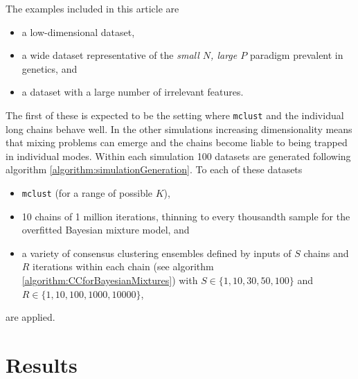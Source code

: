 \documentclass{bioinfo}
\begin{document}
The examples included in this article are
\begin{itemize}
	\item a low-dimensional dataset,
	\item a wide dataset representative of the \emph{small $N$, large $P$} paradigm prevalent in genetics, and
	\item a dataset with a large number of irrelevant features.
\end{itemize}
The first of these is expected to be the setting where \texttt{mclust} and the individual long chains behave well. In the other simulations increasing dimensionality means that mixing problems can emerge and the chains become liable to being trapped in individual modes. Within each simulation 100 datasets are generated following algorithm \ref{algorithm:simulationGeneration}. To each of these datasets 

\begin{itemize}
	\item \texttt{mclust} (for a range of possible $K$),
	\item 10 chains of 1 million iterations, thinning to every thousandth sample for the overfitted Bayesian mixture model, and
	\item a variety of consensus clustering ensembles defined by inputs of $S$ chains and $R$ iterations within each chain (see algorithm \ref{algorithm:CCforBayesianMixtures}) with $S \in \{1, 10, 30, 50, 100\}$ and $R \in \{1, 10, 100, 1000, 10000\}$,
\end{itemize}
are applied.






\section*{Results}
\end{document}
